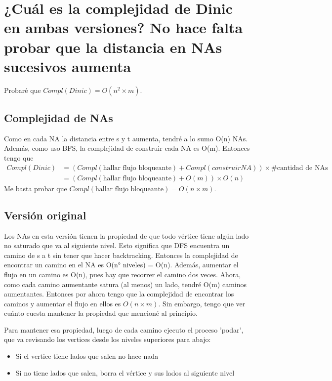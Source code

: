\documentclass[11pt]{article}
\begin{document}
\section{¿Cuál es la complejidad de Dinic en ambas versiones? No hace falta probar que la distancia en NAs sucesivos aumenta}
\label{sec:orgca8f71e}
Probaré que \(Compl(Dinic) = O(n^2 \times m)\).
\subsection{Complejidad de NAs}
\label{sec:org4787d95}
Como en cada NA la distancia entre s y t aumenta, tendré a lo sumo O(n) NAs. Además, como uso BFS, la complejidad de construir cada NA es O(m).
Entonces tengo que
\begin{align*}
Compl(Dinic) & = (Compl(\text{hallar flujo bloqueante}) + Compl(construir NA)) \times \# \text{cantidad de NAs} \\
& = (Compl(\text{hallar flujo bloqueante}) + O(m)) \times O(n)
\end{align*}
Me basta probar que \(Compl(\text{hallar flujo bloqueante}) = O(n \times m)\).

\subsection{Versión original}
\label{sec:org821c7b7}
Los NAs en esta versión tienen la propiedad de que todo vértice tiene algún lado no saturado que va al siguiente nivel. Esto significa que DFS encuentra un camino de s a t sin tener que hacer backtracking. Entonces la complejidad de encontrar un camino en el NA es O(n° niveles) = O(n). Además, aumentar el flujo en un camino es O(n), pues hay que recorrer el camino dos veces. Ahora, como cada camino aumentante satura (al menos) un lado, tendré O(m) caminos aumentantes.
Entonces por ahora tengo que la complejidad de encontrar los caminos y aumentar el flujo en ellos es \({O(n \times m)}\). Sin embargo, tengo que ver cuánto cuesta mantener la propiedad que mencioné al principio.

Para mantener esa propiedad, luego de cada camino ejecuto el proceso 'podar', que va revisando los vertices desde los niveles superiores para abajo:
\begin{itemize}
\item Si el vertice tiene lados que salen no hace nada
\item Si no tiene lados que salen, borra el vértice y sus lados al siguiente nivel
\end{itemize}
\end{document}

